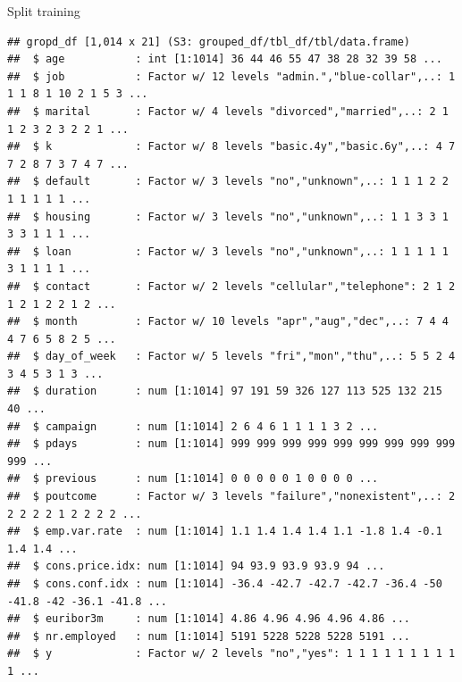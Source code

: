 \documentclass[
]{article}
\newenvironment{Shaded}{\begin{snugshade}}{\end{snugshade}}
\newcommand{\AttributeTok}[1]{\textcolor[rgb]{0.13,0.29,0.53}{#1}}
\newcommand{\ConstantTok}[1]{\textcolor[rgb]{0.56,0.35,0.01}{#1}}
\newcommand{\DecValTok}[1]{\textcolor[rgb]{0.00,0.00,0.81}{#1}}
\newcommand{\FloatTok}[1]{\textcolor[rgb]{0.00,0.00,0.81}{#1}}
\newcommand{\FunctionTok}[1]{\textcolor[rgb]{0.13,0.29,0.53}{\textbf{#1}}}
\newcommand{\NormalTok}[1]{#1}
\newcommand{\OtherTok}[1]{\textcolor[rgb]{0.56,0.35,0.01}{#1}}
\newcommand{\SpecialCharTok}[1]{\textcolor[rgb]{0.81,0.36,0.00}{\textbf{#1}}}
\begin{document}
Split training

\begin{Shaded}
\end{Shaded}

\begin{verbatim}
## gropd_df [1,014 x 21] (S3: grouped_df/tbl_df/tbl/data.frame)
##  $ age           : int [1:1014] 36 44 46 55 47 38 28 32 39 58 ...
##  $ job           : Factor w/ 12 levels "admin.","blue-collar",..: 1 1 1 8 1 10 2 1 5 3 ...
##  $ marital       : Factor w/ 4 levels "divorced","married",..: 2 1 1 2 3 2 3 2 2 1 ...
##  $ k             : Factor w/ 8 levels "basic.4y","basic.6y",..: 4 7 7 2 8 7 3 7 4 7 ...
##  $ default       : Factor w/ 3 levels "no","unknown",..: 1 1 1 2 2 1 1 1 1 1 ...
##  $ housing       : Factor w/ 3 levels "no","unknown",..: 1 1 3 3 1 3 3 1 1 1 ...
##  $ loan          : Factor w/ 3 levels "no","unknown",..: 1 1 1 1 1 3 1 1 1 1 ...
##  $ contact       : Factor w/ 2 levels "cellular","telephone": 2 1 2 1 2 1 2 2 1 2 ...
##  $ month         : Factor w/ 10 levels "apr","aug","dec",..: 7 4 4 4 7 6 5 8 2 5 ...
##  $ day_of_week   : Factor w/ 5 levels "fri","mon","thu",..: 5 5 2 4 3 4 5 3 1 3 ...
##  $ duration      : num [1:1014] 97 191 59 326 127 113 525 132 215 40 ...
##  $ campaign      : num [1:1014] 2 6 4 6 1 1 1 1 3 2 ...
##  $ pdays         : num [1:1014] 999 999 999 999 999 999 999 999 999 999 ...
##  $ previous      : num [1:1014] 0 0 0 0 0 1 0 0 0 0 ...
##  $ poutcome      : Factor w/ 3 levels "failure","nonexistent",..: 2 2 2 2 2 1 2 2 2 2 ...
##  $ emp.var.rate  : num [1:1014] 1.1 1.4 1.4 1.4 1.1 -1.8 1.4 -0.1 1.4 1.4 ...
##  $ cons.price.idx: num [1:1014] 94 93.9 93.9 93.9 94 ...
##  $ cons.conf.idx : num [1:1014] -36.4 -42.7 -42.7 -42.7 -36.4 -50 -41.8 -42 -36.1 -41.8 ...
##  $ euribor3m     : num [1:1014] 4.86 4.96 4.96 4.96 4.86 ...
##  $ nr.employed   : num [1:1014] 5191 5228 5228 5228 5191 ...
##  $ y             : Factor w/ 2 levels "no","yes": 1 1 1 1 1 1 1 1 1 1 ...

\end{verbatim}
\end{document}
